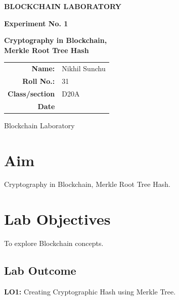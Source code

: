 \documentclass[12pt,a4paper]{article}
\begin{document}
\begin{titlepage}
    \centering
    \vspace*{1.5cm}

    {\Large\bfseries BLOCKCHAIN LABORATORY\par}
    \vspace{1.2cm}

    {\large\bfseries Experiment No. 1\par}
    \vspace{0.8cm}

    {\LARGE\bfseries Cryptography in Blockchain,\\
    Merkle Root Tree Hash\par}

    \vspace{1cm}

    \begin{tabular}{rl}
    \textbf{Name:} & Nikhil Sunchu \\[0.6cm]
    \textbf{Roll No.:} & 31 \\[0.6cm]
    \textbf{Class/section} & D20A \\[0.6cm]
    \textbf{Date}& \hrulefill \\[0.6cm]
    \end{tabular}

    \vfill
    {\large Blockchain Laboratory\par}
\end{titlepage}

\section{Aim}
Cryptography in Blockchain, Merkle Root Tree Hash.

\section{Lab Objectives}
To explore Blockchain concepts.

\subsection{Lab Outcome}
\textbf{LO1:} Creating Cryptographic Hash using Merkle Tree.

\end{document}
